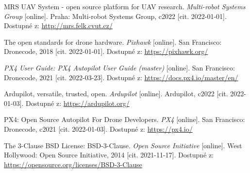 

\begin{thebibliography}{99}

MRS UAV System - open source platform for UAV research. \textit{Multi-robot Systems Group} [online]. Praha: Multi-robot Systems Group, c2022 [cit. 2022-01-01]. Dostupné z: \href{http://mrs.felk.cvut.cz/}{http://mrs.felk.cvut.cz/}

The open standards for drone hardware. \textit{Pixhawk} [online]. San Francisco: Dronecode, 2018 [cit. 2022-01-01]. Dostupné z: \href{https://pixhawk.org/}{https://pixhawk.org/}

\textit{PX4 User Guide: PX4 Autopilot User Guide (master)} [online]. San Francisco: Dronecode, 2021 [cit. 2022-03-23]. Dostupné z: \href{https://docs.px4.io/master/en/}{https://docs.px4.io/master/en/}


Ardupilot, versatile, trusted, open. \textit{Ardupilot} [online]. Ardupilot, c2022 [cit. 2022-01-03]. Dostupné z: \href{https://ardupilot.org/}{https://ardupilot.org/}

PX4: Open Source Autopilot For Drone Developers. \textit{PX4} [online]. San Francisco: Dronecode, c2021 [cit. 2022-01-03]. Dostupné z: \href{https://px4.io/}{https://px4.io/}

The 3-Clause BSD License: BSD-3-Clause. \textit{Open Source Initiative} [online]. West Hollywood: Open Source Initiative, 2014 [cit. 2021-11-17]. Dostupné z: \href{https://opensource.org/licenses/BSD-3-Clause}{https://opensource.org/licenses/BSD-3-Clause}



\end{thebibliography}
